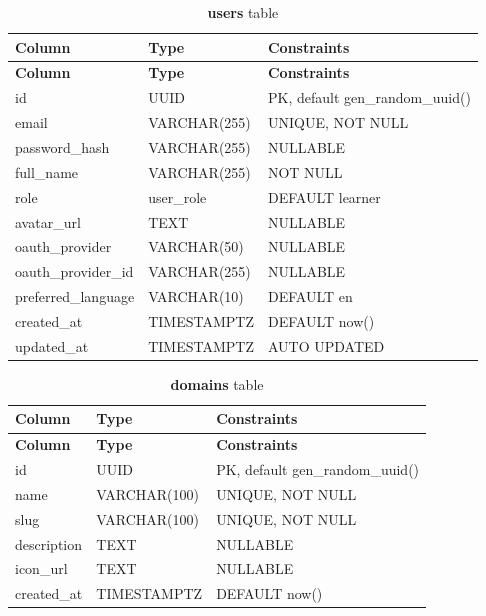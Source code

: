 \begin{longtable}{p{3cm}p{2.5cm}p{5cm}}
\caption{\textbf{users} table}
\label{tab:ch04_users}\\
\toprule
\textbf{Column} & \textbf{Type} & \textbf{Constraints} \\
\midrule
\endfirsthead
\toprule
\textbf{Column} & \textbf{Type} & \textbf{Constraints} \\
\midrule
\endhead
id & UUID & PK, default gen\_random\_uuid() \\
email & VARCHAR(255) & UNIQUE, NOT NULL \\
password\_hash & VARCHAR(255) & NULLABLE \\
full\_name & VARCHAR(255) & NOT NULL \\
role & user\_role & DEFAULT learner \\
avatar\_url & TEXT & NULLABLE \\
oauth\_provider & VARCHAR(50) & NULLABLE \\
oauth\_provider\_id & VARCHAR(255) & NULLABLE \\
preferred\_language & VARCHAR(10) & DEFAULT en \\
created\_at & TIMESTAMPTZ & DEFAULT now() \\
updated\_at & TIMESTAMPTZ & AUTO UPDATED \\
\bottomrule
\end{longtable}

\begin{longtable}{p{3cm}p{2.5cm}p{5cm}}
\caption{\textbf{domains} table}
\label{tab:ch04_domains}\\
\toprule
\textbf{Column} & \textbf{Type} & \textbf{Constraints} \\
\midrule
\endfirsthead
\toprule
\textbf{Column} & \textbf{Type} & \textbf{Constraints} \\
\midrule
\endhead
id & UUID & PK, default gen\_random\_uuid() \\
name & VARCHAR(100) & UNIQUE, NOT NULL \\
slug & VARCHAR(100) & UNIQUE, NOT NULL \\
description & TEXT & NULLABLE \\
icon\_url & TEXT & NULLABLE \\
created\_at & TIMESTAMPTZ & DEFAULT now() \\
\bottomrule
\end{longtable}

